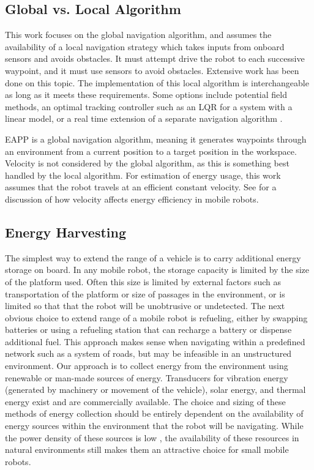 \documentclass[journal]{IEEEtran}
\newcounter{col}
\begin{document}
\subsection{Global vs. Local Algorithm}
This work focuses on the global navigation algorithm, and assumes the availability of a local navigation strategy which takes inputs from onboard sensors and avoids obstacles. 
It must attempt drive the robot to each successive waypoint, and it must use sensors to avoid obstacles. 
Extensive work\cite{siegwart2011introduction} has been done on this topic. 
The implementation of this local algorithm is interchangeable as long as it meets these requirements. Some options include potential field methods, an optimal tracking controller such as an LQR for a system with a linear model, or a real time extension of a separate navigation algorithm \cite{bruce2002real}.

EAPP is a global navigation algorithm, meaning it generates waypoints through an environment from a current position to a target position in the workspace. 
Velocity is not considered by the global algorithm, as this is something best handled by the local algorithm. For estimation of energy usage, this work assumes that the robot travels at an efficient constant velocity.
See \cite{mei2006deployment} for a discussion of how velocity affects energy efficiency in mobile robots.

\subsection{Energy Harvesting}
The simplest way to extend the range of a vehicle is to carry additional energy storage on board. 
In any mobile robot, the storage capacity is limited by the size of the platform used. 
Often this size is limited by external factors such as transportation of the platform or size of passages in the environment, or is limited so that that the robot will be unobtrusive or undetected. 
The next obvious choice to extend range of a mobile robot is refueling, either by swapping batteries or using a refueling station that can recharge a battery or dispense additional fuel. 
This approach makes sense when navigating within a predefined network such as a system of roads, but may be infeasible in an unstructured environment. 
Our approach is to collect energy from the environment using renewable or man-made sources of energy. 
Transducers for vibration energy (generated by machinery or movement of the vehicle)\cite{wickenheiser2010design}, solar energy, and thermal energy exist and are commercially available. 
The choice and sizing of these methods of energy collection should be entirely dependent on the availability of energy sources within the environment that the robot will be navigating. 
While the power density of these sources is low \cite{layton2008comparison}, the availability of these resources in natural environments still makes them an attractive choice for small mobile robots. 
\end{document}
